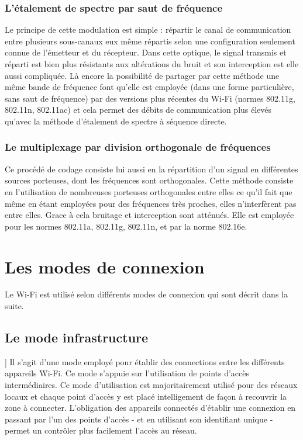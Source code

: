 \documentclass[12pt]{article}
\begin{document}
\subsubsection{L'étalement de spectre par saut de fréquence}
Le principe de cette modulation est simple : répartir le canal de communication entre plusieurs sous-canaux eux même répartis selon une configuration seulement connue de l'émetteur et du récepteur. Dans cette optique, le signal transmis et réparti est bien plus résistants aux altérations du bruit et son interception est elle aussi compliquée. Là encore la possibilité de partager par cette méthode une même bande de fréquence font qu'elle est employée (dans une forme particulière, sans saut de fréquence) par des versions plus récentes du Wi-Fi (normes 802.11g, 802.11n, 802.11ac) et cela permet des débits de communication plus élevés qu'avec la méthode d'étalement de spectre à séquence directe.

\subsubsection{Le multiplexage par division orthogonale de fréquences}
Ce procédé de codage consiste lui aussi en la répartition d'un signal en différentes sources porteuses, dont les fréquences sont orthogonales. Cette méthode consiste en l'utilisation de nombreuses porteuses orthogonales entre elles ce qu'il fait que même en étant employées pour des fréquences très proches, elles n'interfèrent pas entre elles. Grace à cela bruitage et interception sont atténués. Elle est employée pour les normes 802.11a, 802.11g, 802.11n, et par la norme 802.16e.

\newpage
\section{Les modes de connexion}
Le Wi-Fi est utilisé selon différents modes de connexion qui sont décrit dans la suite.

\subsection{Le mode infrastructure}]
Il s'agit d'une mode employé pour établir des connections entre les différents appareils Wi-Fi. Ce mode s'appuie sur l'utilisation de points d'accès intermédiaires. Ce mode d'utilisation est majoritairement utilisé pour des réseaux locaux et chaque point d'accès y est placé intelligement de façon à recouvrir la zone à connecter. L'obligation des appareils connectés d'établir une connexion en passant par l'un des points d'accès - et en utilisant son identifiant unique - permet un contrôler plus facilement l'accès au réseau.
\end{document}
